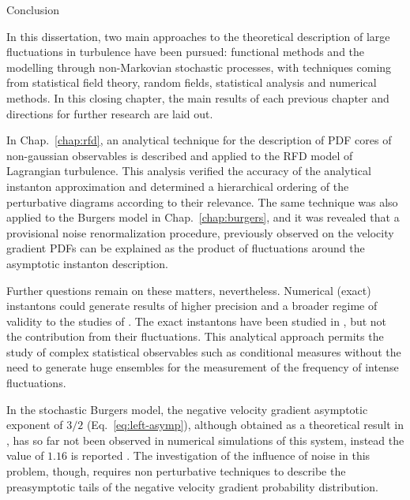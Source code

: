 \begin{chapter}{Conclusion}
\label{chap:conclusion}

In this dissertation, two main approaches to the theoretical description of large fluctuations in turbulence have been pursued: functional methods and the modelling through non-Markovian stochastic processes, with techniques coming from statistical field theory, random fields, statistical analysis and numerical methods. In this closing chapter, the main results of each previous chapter and directions for further research are laid out.

In Chap.~\ref{chap:rfd}, an analytical technique for the description of PDF cores of non-gaussian observables is described and applied to the RFD model of Lagrangian turbulence. This analysis verified the accuracy of the analytical instanton approximation and determined a hierarchical ordering of the perturbative diagrams according to their relevance. The same technique was also applied to the Burgers model in Chap.~\ref{chap:burgers}, and it was revealed that a provisional noise renormalization procedure, previously observed on the velocity gradient PDFs can be explained as the product of fluctuations around the asymptotic instanton description.

Further questions remain on these matters, nevertheless. Numerical (exact) instantons could generate results of higher precision and a broader regime of validity to the studies of \textcite{apolinario2019instantons,apolinario2019onset}. The exact instantons have been studied in \textcite{grafke2015instanton,grigorio2017instantons,ebener2019}, but not the contribution from their fluctuations.
This analytical approach permits the study of complex statistical observables such as conditional measures without the need to generate huge ensembles for the measurement of the frequency of intense fluctuations.


In the stochastic Burgers model, the negative velocity gradient asymptotic exponent of $3/2$ (Eq.~\ref{eq:left-asymp}), although obtained as a theoretical result in \textcite{balkovsky1997}, has so far not been observed in numerical simulations of this system, instead the value of $1.16$ is reported \parencite{grafke2015relevance}. The investigation of the influence of noise in this problem, though, requires non perturbative techniques to describe the preasymptotic tails of the negative velocity gradient probability distribution.


\end{chapter}
